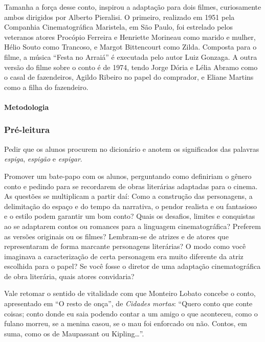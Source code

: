 \documentclass[11pt]{extarticle}
\begin{document}
Tamanha a força desse conto, inspirou a adaptação para dois filmes,
curiosamente ambos dirigidos por Alberto Pieralisi. O primeiro,
realizado em 1951 pela Companhia Cinematográfica Maristela, em São
Paulo, foi estrelado pelos veteranos atores Procópio Ferreira e
Henriette Morineau como marido e mulher, Hélio Souto como Trancoso, e
Margot Bittencourt como Zilda. Composta para o filme, a música ``Festa
no Arraiá'' é executada pelo autor Luiz Gonzaga. A outra versão do filme
sobre o conto é de 1974, tendo Jorge Dória e Lélia Abramo como o casal
de fazendeiros, Agildo Ribeiro no papel do comprador, e Eliane Martins
como a filha do fazendeiro.

\paragraph{Metodologia}

\subsubsection{Pré-leitura}

Pedir que os alunos procurem no dicionário e anotem os significados das
palavras \emph{espiga}, \emph{espigão} e \emph{espigar}.

Promover um bate-papo com os alunos, perguntando como definiriam o
gênero conto e pedindo para se recordarem de obras literárias adaptadas
para o cinema. As questões se multiplicam a partir daí: Como a
construção das personagens, a delimitação do espaço e do tempo da
narrativa, o pendor realista e ou fantasioso e o estilo podem garantir
um bom conto? Quais os desafios, limites e conquistas ao se adaptarem
contos ou romances para a linguagem cinematográfica? Preferem as versões
originais ou os filmes? Lembram-se de atrizes e de atores que
representaram de forma marcante personagens literárias? O modo como você
imaginava a caracterização de certa personagem era muito diferente da
atriz escolhida para o papel? Se você fosse o diretor de uma adaptação
cinematográfica de obra literária, quais atores convidaria?

Vale retomar o sentido de vitalidade com que Monteiro Lobato concebe o
conto, apresentado em ``O resto de onça'', de \emph{Cidades mortas}:
``Quero conto que conte coisas; conto donde eu saia podendo contar a um
amigo o que aconteceu, como o fulano morreu, se a menina casou, se o mau
foi enforcado ou não. Contos, em suma, como os de Maupassant ou
Kipling\ldots{}''.

\end{document}
